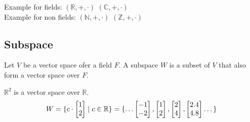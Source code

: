 Example for fields: \((\mathbb{R}, +, \cdot)\) \( (\mathbb{C}, +, \cdot)\) \\
Example for non fields: \((\mathbb{N}, +, \cdot)\) \( (\mathbb{Z}, +, \cdot)\) \\
\subsection{Subspace}
Let \(V\) be a vector space ofer a field \(F\). A subspace \(W\) is a subset of \(V\) that also form a vector space over \(F\).
\begin{example}
    \(\mathbb{R}^2\) is a vector space over \(\mathbb{R}\).
    \begin{align*}
        W = \{c \cdot \begin{bmatrix}
                1 \\2
            \end{bmatrix}
         \mid c \in \mathbb{R} \} = \{ \dots \begin{bmatrix}
            -1 \\ -2
        \end{bmatrix}, \begin{bmatrix}
            1 \\2
        \end{bmatrix}, \begin{bmatrix}
            2 \\4
        \end{bmatrix},\begin{bmatrix}
            2.4 \\ 4.8
        \end{bmatrix} \dots
        \}
    \end{align*}
\end{example}
